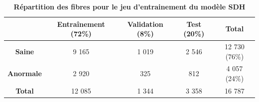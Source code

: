 \begin{table}[!ht]
\centering
\caption[Répartition des fibres pour le jeu d'entraînement du modèle SDH]{\textbf{Répartition des fibres pour le jeu d'entrainement du modèle SDH}}
\label{tab:sdh_fiber_count}
\begin{tabular}{|c|c|c|c|c|}
\hline
 & \textbf{Entraînement} (72\%) & \textbf{Validation} (8\%) & \textbf{Test} (20\%) & \textbf{Total} \\
\hline
\textbf{Saine} & 9 165 & 1 019 & 2 546 & 12 730 (76\%) \\
\hline
\textbf{Anormale} & 2 920 & 325 & 812 & 4 057 (24\%) \\
\hline
\hline
\textbf{Total} & 12 085 & 1 344 & 3 358 & 16 787 \\
\hline
\end{tabular}
\end{table}


